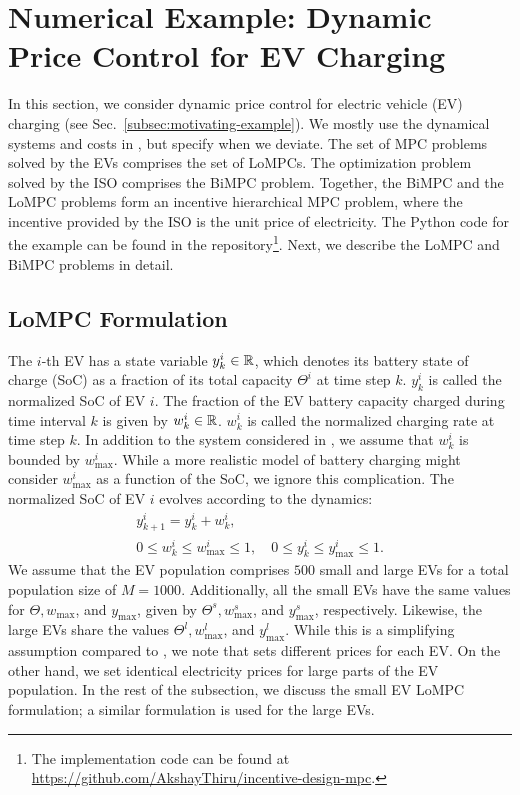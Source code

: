 \section{Numerical Example: Dynamic Price Control for EV Charging}
\label{sec:numerical-examples}

In this section, we consider dynamic price control for electric vehicle (EV) charging (see Sec.~\ref{subsec:motivating-example}).
We mostly use the dynamical systems and costs in \cite{ma2013decentralized,zou2017efficient}, but specify when we deviate.
The set of MPC problems solved by the EVs comprises the set of LoMPCs.
The optimization problem solved by the ISO comprises the BiMPC problem.
Together, the BiMPC and the LoMPC problems form an incentive hierarchical MPC problem, where the incentive provided by the ISO is the unit price of electricity.
The Python code for the example can be found in the repository\footnote{
\label{code}
The implementation code can be found at \url{https://github.com/AkshayThiru/incentive-design-mpc}.
}.
Next, we describe the LoMPC and BiMPC problems in detail.


\subsection{LoMPC Formulation}
\label{subsec:ev-lompc-formulation}

The $i$-th EV has a state variable $y^i_k \in \mathbb{R}$, which denotes its battery state of charge (SoC) as a fraction of its total capacity $\Theta^i$ at time step $k$.
$y^i_k$ is called the normalized SoC of EV $i$.
The fraction of the EV battery capacity charged during time interval $k$ is given by $w^i_k \in \mathbb{R}$.
$w^i_k$ is called the normalized charging rate at time step $k$.
In addition to the system considered in \cite{zou2017efficient}, we assume that $w^i_k$ is bounded by $w^i_\text{max}$.
While a more realistic model of battery charging might consider $w^i_\text{max}$ as a function of the SoC, we ignore this complication.
The normalized SoC of EV $i$ evolves according to the dynamics:
\begin{equation}
\label{eq:ev-lompc-dynamics}
\begin{gathered}
    y^i_{k+1} = y^i_k + w^i_k, \\
    0 \leq w^i_k \leq w^i_\text{max} \leq 1, \quad 0 \leq y^i_k \leq y^i_\text{max} \leq 1.
\end{gathered}
\end{equation}
We assume that the EV population comprises $500$ small and large EVs for a total population size of $M = 1000$.
Additionally, all the small EVs have the same values for $\Theta, w_\text{max}$, and $y_\text{max}$, given by $\Theta^s, w^s_\text{max}$, and $y^s_\text{max}$, respectively.
Likewise, the large EVs share the values $\Theta^l, w^l_\text{max}$, and $y^l_\text{max}$.
While this is a simplifying assumption compared to \cite{zou2017efficient}, we note that \cite{zou2017efficient} sets different prices for each EV.
On the other hand, we set identical electricity prices for large parts of the EV population.
In the rest of the subsection, we discuss the small EV LoMPC formulation; a similar formulation is used for the large EVs.

